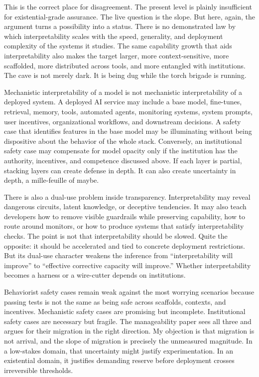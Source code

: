 \documentclass[11pt]{article}
\begin{document}
This is the correct place for disagreement. The present level is plainly insufficient for existential-grade assurance. The live question is the slope. But here, again, the argument turns a possibility into a status. There is no demonstrated law by which interpretability scales with the speed, generality, and deployment complexity of the systems it studies. The same capability growth that aids interpretability also makes the target larger, more context-sensitive, more scaffolded, more distributed across tools, and more entangled with institutions. The cave is not merely dark. It is being dug while the torch brigade is running.

Mechanistic interpretability of a model is not mechanistic interpretability of a deployed system. A deployed AI service may include a base model, fine-tunes, retrieval, memory, tools, automated agents, monitoring systems, system prompts, user incentives, organizational workflows, and downstream decisions. A safety case that identifies features in the base model may be illuminating without being dispositive about the behavior of the whole stack. Conversely, an institutional safety case may compensate for model opacity only if the institution has the authority, incentives, and competence discussed above. If each layer is partial, stacking layers can create defense in depth. It can also create uncertainty in depth, a mille-feuille of maybe.

There is also a dual-use problem inside transparency. Interpretability may reveal dangerous circuits, latent knowledge, or deceptive tendencies. It may also teach developers how to remove visible guardrails while preserving capability, how to route around monitors, or how to produce systems that satisfy interpretability checks. The point is not that interpretability should be slowed. Quite the opposite: it should be accelerated and tied to concrete deployment restrictions. But its dual-use character weakens the inference from ``interpretability will improve'' to ``effective corrective capacity will improve.'' Whether interpretability becomes a harness or a wire-cutter depends on institutions.

Behaviorist safety cases remain weak against the most worrying scenarios because passing tests is not the same as being safe across scaffolds, contexts, and incentives. Mechanistic safety cases are promising but incomplete. Institutional safety cases are necessary but fragile. The manageability paper sees all three and argues for their migration in the right direction. My objection is that migration is not arrival, and the slope of migration is precisely the unmeasured magnitude. In a low-stakes domain, that uncertainty might justify experimentation. In an existential domain, it justifies demanding reserve before deployment crosses irreversible thresholds.
\end{document}
